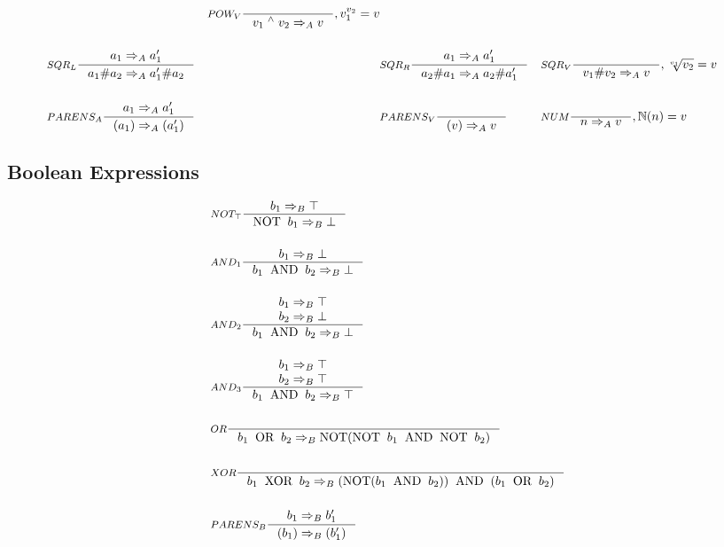\begin{align*}
&
&\inference[$POW_V$]{}
                    {v_1 \; ^\wedge{} \; v_2 \Rightarrow_A v}
										{, v_1 ^ {v_2} = v}
\\\\
&\inference[$SQR_L$]{a_1  \Rightarrow_A a_1'}
                    {a_1 \# a_2 \Rightarrow_A a_1' \# a_2}
&
&\inference[$SQR_R$]{a_1 \Rightarrow_A a_1'}
                    {a_2 \# a_1 \Rightarrow_A a_2 \# a_1'}
&
&\inference[$SQR_V$]{}
                    {v_1 \# v_2 \Rightarrow_A v}
										{, \sqrt[v_1]{v_2} = v}
\\\\
&\inference[$PARENS_A$]{a_1 \Rightarrow_A a_1'}
                       {(a_1) \Rightarrow_A (a_1')}
&
&\inference[$PARENS_V$]{}
                       {(v) \Rightarrow_A v}
&
&\inference[$NUM$]{}
                  {n \Rightarrow_A v}
									{, \mathbb{N}(n) = v}
\end{align*}

\subsection{Boolean Expressions}
\begin{align*}
&\inference[$NOT_\top$]{b_1 \Rightarrow_B \top}
                       {\textrm{NOT} \;\; b_1 \Rightarrow_B \bot}
\\\\
&\inference[$AND_1$]{b_1 \Rightarrow_B \bot}
                    {b_1 \;\; \textrm{AND} \;\; b_2 \Rightarrow_B \bot}
\\\\
&\inference[$AND_2$]{b_1 \Rightarrow_B \top \\ b_2 \Rightarrow_B \bot}
								    {b_1 \;\; \textrm{AND} \;\; b_2 \Rightarrow_B \bot}
\\\\
&\inference[$AND_3$]{b_1 \Rightarrow_B \top \\ b_2 \Rightarrow_B \top}
								    {b_1 \;\; \textrm{AND} \;\; b_2 \Rightarrow_B \top}
\\\\
&\inference[$OR$]{}
                 {b_1 \;\; \textrm{OR} \;\; b_2 \Rightarrow_B \textrm{NOT}(\textrm{NOT} \;\; b_1 \;\; \textrm{AND} \;\; \textrm{NOT} \;\; b_2)}
\\\\
&\inference[$XOR$]{}
                  {b_1 \;\; \textrm{XOR} \;\; b_2 \Rightarrow_B (\textrm{NOT}(b_1 \;\; \textrm{AND} \;\; b_2)) \;\; \textrm{AND} \;\; (b_1 \;\; \textrm{OR} \;\; b_2)}
\\\\
&\inference[$PARENS_B$]{b_1 \Rightarrow_B b_1'}
                       {(b_1) \Rightarrow_B (b_1')}
\end{align*}

